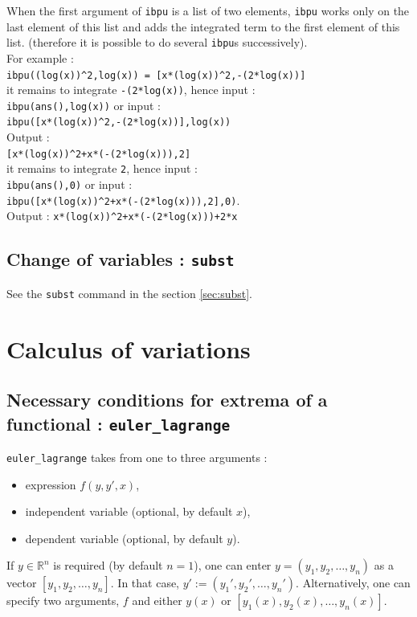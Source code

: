 \documentclass[a4paper,11pt]{book}
\begin{document}
When the first argument of {\tt ibpu} is a list of two elements, {\tt ibpu} 
works only on the last element of this list and adds the integrated term to
the first element of this list.  
(therefore it is possible to do several {\tt ibpu}s successively).\\
For example :\\
{\tt ibpu((log(x))\verb|^|2,log(x)) = [x*(log(x))\verb|^|2,-(2*log(x))]}\\ 
it remains to integrate {\tt -(2*log(x))}, hence input : \\
{\tt ibpu(ans(),log(x))}
 or input :\\
{\tt ibpu([x*(log(x))\verb|^|2,-(2*log(x))],log(x))}\\
Output :\\
{\tt [x*(log(x))\verb|^|2+x*(-(2*log(x))),2]}\\
it remains to integrate  {\tt 2}, hence input :\\
{\tt ibpu(ans(),0)} or input :\\
{\tt ibpu([x*(log(x))\verb|^|2+x*(-(2*log(x))),2],0)}.\\
Output :
{\tt x*(log(x))\verb|^|2+x*(-(2*log(x)))+2*x}

\subsection{Change of variables : {\tt subst}}
See the {\tt subst} command  in the section \ref{sec:subst}.

\section{Calculus of variations}

\subsection{Necessary conditions for extrema of a functional : {\tt euler\_lagrange}}
{\tt euler\_lagrange} takes from one to three arguments :
\begin{itemize}
  \item expression $f(y,y',x)$,
  \item independent variable (optional, by default $x$),
  \item dependent variable (optional, by default $y$).
\end{itemize}
If $y\in\mathbb{R}^n$ is required (by default $n=1$), one can enter $y=(y_1,y_2,\dots,y_n)$ as a vector $[y_1,y_2,\dots,y_n]$. In that case, $y':=(y_1',y_2',\dots,y_n')$. Alternatively, one can specify two arguments, $f$ and either $y(x)$ or $[y_1(x),y_2(x),\dots,y_n(x)]$.
\end{document}
